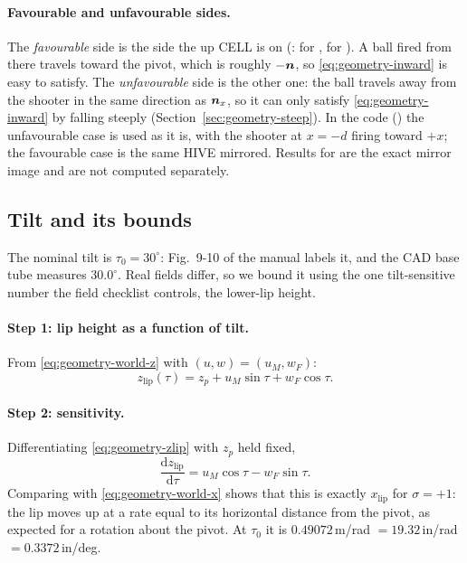 \paragraph{Favourable and unfavourable sides.} The \emph{favourable} side is the side the up CELL
is on (:  for ,  for
). A ball fired from there travels toward the pivot, which is roughly
$-\bm{n}$, so \eqref{eq:geometry-inward} is easy to satisfy. The \emph{unfavourable} side is the
other one: the ball travels away from the shooter in the same direction as $\bm{n}_x$, so it can
only satisfy \eqref{eq:geometry-inward} by falling steeply (Section~\ref{sec:geometry-steep}). In the code
() the unfavourable case is  used as it is, with the
shooter at $x = -d$ firing toward $+x$; the favourable case is the same HIVE mirrored. Results for
 are the exact mirror image and are not computed separately.

\subsection{Tilt and its bounds}
\label{sec:geometry-tilt}

The nominal tilt is $\tau_0 = 30^\circ$\confirmed: Fig.\ 9-10 of the manual labels it, and the CAD
base tube measures $30.0^\circ$\confirmed. Real fields differ, so we bound it using the one
tilt-sensitive number the field checklist controls, the lower-lip height.

\paragraph{Step 1: lip height as a function of tilt.} From \eqref{eq:geometry-world-z} with
$(u, w) = (u_M, w_F)$:
\begin{equation}
  z_{\mathrm{lip}}(\tau) = z_p + u_M\sin\tau + w_F\cos\tau.
  \label{eq:geometry-zlip}
\end{equation}

\paragraph{Step 2: sensitivity.} Differentiating \eqref{eq:geometry-zlip} with $z_p$ held fixed,
\begin{equation}
  \frac{\mathrm{d}z_{\mathrm{lip}}}{\mathrm{d}\tau} = u_M\cos\tau - w_F\sin\tau .
  \label{eq:geometry-dzdtau}
\end{equation}
Comparing with \eqref{eq:geometry-world-x} shows that this is exactly $x_{\mathrm{lip}}$ for
$\sigma = +1$: the lip moves up at a rate equal to its horizontal distance from the pivot, as
expected for a rotation about the pivot. At $\tau_0$ it is $0.49072$\,\unit{m/rad}\derived{} $=
19.32$\,\unit{in/rad}\derived{} $= 0.3372$\,\unit{in/deg}\derived.

